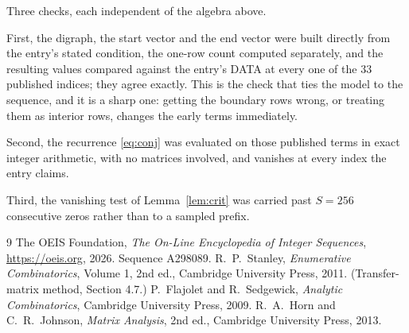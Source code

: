 \documentclass[11pt,a4paper]{article}
\theoremstyle{plain}
\theoremstyle{definition}
\begin{document}
Three checks, each independent of the algebra above.

First, the digraph, the start vector and the end vector were built directly from the
entry's stated condition, the one-row count computed separately, and the resulting values
compared against the entry's DATA at every one of the $33$ published indices; they
agree exactly. This is the check that ties the model to the sequence, and it is a sharp one:
getting the boundary rows wrong, or treating them as interior rows, changes the early terms
immediately.

Second, the recurrence \eqref{eq:conj} was evaluated on those published terms in exact
integer arithmetic, with no matrices involved, and vanishes at every index the entry claims.

Third, the vanishing test of Lemma~\ref{lem:crit} was carried past $S=256$ consecutive
zeros rather than to a sampled prefix.

\begin{thebibliography}{9}
 The OEIS Foundation, \emph{The On-Line Encyclopedia of Integer
Sequences}, \url{https://oeis.org}, 2026. Sequence A298089.
 R.~P.~Stanley, \emph{Enumerative Combinatorics}, Volume 1, 2nd ed.,
Cambridge University Press, 2011. (Transfer-matrix method, Section 4.7.)
 P.~Flajolet and R.~Sedgewick, \emph{Analytic Combinatorics}, Cambridge
University Press, 2009.
 R.~A.~Horn and C.~R.~Johnson, \emph{Matrix Analysis}, 2nd ed., Cambridge
University Press, 2013.
\end{thebibliography}
\end{document}
